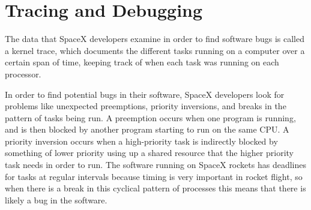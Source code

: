\documentclass{hmcclinic}
\begin{document}
\section{Tracing and Debugging}
The data that SpaceX developers examine in order to find software bugs is called
a kernel trace, which documents the different tasks running on a computer over a
certain span of time, keeping track of when each task was running on each processor. 

In order to find potential bugs in their software, SpaceX developers look for
problems like unexpected preemptions, priority inversions, and breaks in the
pattern of tasks being run. A preemption occurs when one program is running, and
is then blocked by another program starting to run on the same CPU. A priority
inversion occurs when a high-priority task is indirectly blocked by something of
lower priority using up a shared resource that the higher priority task needs in
order to run. The software running on SpaceX rockets has deadlines for tasks at regular intervals because timing is very important in rocket flight, so when there is a break in this cyclical pattern of processes this means that there is likely a bug in the software.
\end{document}
